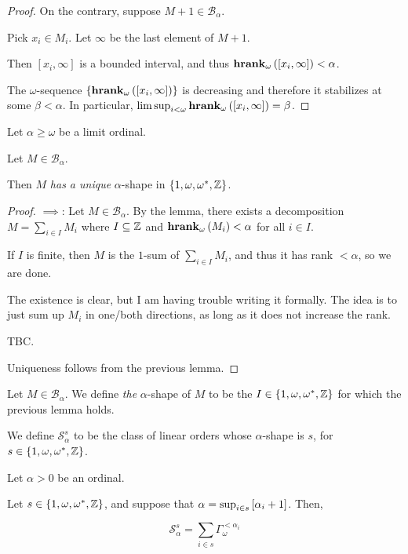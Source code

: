 \begin{proof}
  On the contrary, suppose $M + 1 \in \mathcal{B}_{\alpha}$.

  Pick $x_i \in M_i$. Let $\infty$ be the last element of $M + 1$.

  Then $[x_i, \infty]$ is a bounded interval, and thus
  $\mathbf{hrank}_{\omega}\left( [x_i, \infty] \right) < \alpha$.

  The $\omega$-sequence $\left\{ {\mathbf{hrank}_{\omega}\left( [x_i, \infty] \right)} \right\}$
  is decreasing and therefore it stabilizes at some $\beta < \alpha$.
  In particular, $\limsup_{i < \omega}{\mathbf{hrank}_{\omega}\left( [x_i, \infty] \right)} = \beta$.
\end{proof}


\begin{lemma}
  Let $\alpha \ge \omega$ be a limit ordinal.

  Let $M \in \mathcal{B}_{\alpha}$.

  Then $M$ \emph{has a unique} $\alpha$-shape in $\left\{ {1, \omega, \omega^\ast, \mathbb{Z}} \right\}$.
\end{lemma}

\begin{proof}
  $\implies$: Let $M \in \mathcal{B}_{\alpha}$. By the lemma,
  there exists a decomposition $M = \sum_{i \in I} M_i$ where
  $I \subseteq \mathbb{Z}$ and $\mathbf{hrank}_{\omega}\left( M_i \right) < \alpha$ for all $i \in I$.

  If $I$ is finite, then $M$ is the $1$-sum of $\sum_{i \in I} M_i$,
  and thus it has rank $< \alpha$, so we are done.

  The existence is clear, but I am having trouble writing
  it formally. The idea is to just sum up $M_i$ in one/both directions,
  as long as it does not increase the rank.

  TBC.

  Uniqueness follows from the previous lemma.
\end{proof}

\begin{definition}
  Let $M \in \mathcal{B}_{\alpha}$. We define \emph{the} $\alpha$-shape
  of $M$ to be the $I \in \left\{ {1, \omega, \omega^\ast, \mathbb{Z}} \right\}$
  for which the previous lemma holds.

  We define $\mathcal{S}^{s}_{\alpha}$ to be the class of linear orders
  whose $\alpha$-shape is $s$, for $s \in \left\{ {1, \omega, \omega^\ast, \mathbb{Z}} \right\}$.
\end{definition}

\begin{lemma}
  Let $\alpha > 0$ be an ordinal.

  Let $s \in \left\{ {1, \omega, \omega^\ast, \mathbb{Z}} \right\}$, and suppose that
  $\alpha = \sup_{i \in s} \left[ {\alpha_i + 1} \right]$.
  Then,

  \[
    \mathcal{S}^{s}_{\alpha} = \sum_{i \in s}{\Gamma_{\omega}^{< \alpha_i}}
  \]
\end{lemma}

